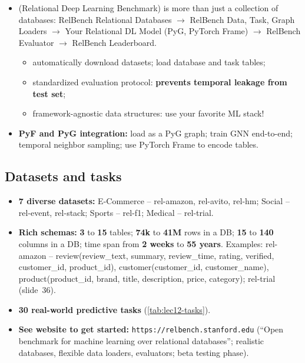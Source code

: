 \begin{itemize}
  \item {} (Relational Deep Learning Benchmark) is more than just a
    collection of databases: RelBench Relational Databases $\to$ RelBench Data, Task,
    Graph Loaders $\to$ Your Relational DL Model (PyG, PyTorch Frame) $\to$ RelBench
    Evaluator $\to$ RelBench Leaderboard.
    \begin{itemize}
      \item automatically download datasets; load database and task tables;
      \item standardized evaluation protocol: \textbf{prevents temporal leakage from test
        set};
      \item framework-agnostic data structures: use your favorite ML stack!
    \end{itemize}
  \item \textbf{PyF and PyG integration:} load as a PyG graph; train GNN end-to-end;
    temporal neighbor sampling; use PyTorch Frame to encode tables.
\end{itemize}

\subsection{Datasets and tasks}\label{sec:lec12-datasets}

\begin{itemize}
  \item \textbf{7 diverse datasets:} E-Commerce -- rel-amazon, rel-avito, rel-hm; Social
    -- rel-event, rel-stack; Sports -- rel-f1; Medical -- rel-trial.
  \item \textbf{Rich schemas:} \textbf{3} to \textbf{15} tables; \textbf{74k} to
    \textbf{41M} rows in a DB; \textbf{15} to \textbf{140} columns in a DB; time span
    from \textbf{2 weeks} to \textbf{55 years}. Examples: rel-amazon -- review(review\_text,
    summary, review\_time, rating, verified, customer\_id, product\_id),
    customer(customer\_id, customer\_name), product(product\_id, brand, title,
    description, price, category); rel-trial (slide~36).
  \item \textbf{30 real-world predictive tasks} (\cref{tab:lec12-tasks}).
  \item \textbf{See website to get started:} \texttt{https://relbench.stanford.edu}
    (``Open benchmark for machine learning over relational databases''; realistic
    databases, flexible data loaders, evaluators; beta testing phase).
\end{itemize}

